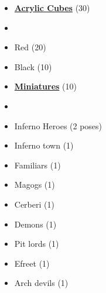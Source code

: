 \begin{multicols*}{3}
\begin{itemize}[leftmargin=0pt, label={}, noitemsep, noitemsep]
  \item \textbf{\small{\underline{Acrylic Cubes}}} (30)
  \item
  \item Red (20)
  \item Black (10)
\end{itemize}

\begin{itemize}[leftmargin=0pt, label={}, noitemsep, noitemsep]
  \item \textbf{\small{\underline{Miniatures}}} (10)
  \item
  \item Inferno Heroes (2 poses)
  \item Inferno town (1)
  \item Familiars (1)
  \item Magogs (1)
  \item Cerberi (1)
  \item Demons (1)
  \item Pit lords (1)
  \item Efreet (1)
  \item Arch devils (1)
\end{itemize}


\end{multicols*}
